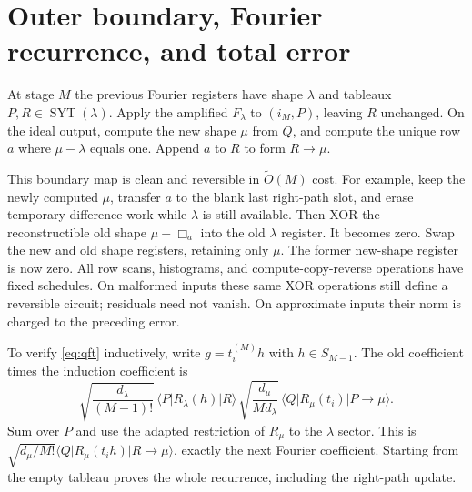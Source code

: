 \documentclass[11pt]{article}
\theoremstyle{definition}
\newcommand{\ket}[1]{\lvert #1\rangle}
\newcommand{\bra}[1]{\langle #1\rvert}
\newcommand{\SYT}{\operatorname{SYT}}
\begin{document}
\section{Outer boundary, Fourier recurrence, and total error}

At stage $M$ the previous Fourier registers have shape $\lambda$ and
tableaux $P,R\in\SYT(\lambda)$. Apply the amplified $F_\lambda$ to
$(i_M,P)$, leaving $R$ unchanged. On the ideal output, compute the new
shape $\mu$ from $Q$, and compute the unique row $a$ where $\mu-\lambda$
equals one. Append $a$ to $R$ to form $R\to\mu$.

This boundary map is clean and reversible in $\widetilde O(M)$ cost.
For example, keep the newly computed $\mu$, transfer $a$ to the blank
last right-path slot, and erase temporary difference work while $\lambda$
is still available. Then XOR the reconstructible old shape
$\mu-\Box_a$ into the old $\lambda$ register. It becomes zero. Swap the
new and old shape registers, retaining only $\mu$. The former new-shape
register is now zero. All row scans, histograms, and compute-copy-reverse
operations have fixed schedules. On malformed inputs these same XOR
operations still define a reversible circuit; residuals need not vanish.
On approximate inputs their norm is charged to the preceding error.

To verify \eqref{eq:qft} inductively, write $g=t_i^{(M)}h$ with
$h\in S_{M-1}$. The old coefficient times the induction coefficient is
\[
 \sqrt{\frac{d_\lambda}{(M-1)!}}\,
 \bra P R_\lambda(h)\ket R\,
 \sqrt{\frac{d_\mu}{M d_\lambda}}\,
 \bra Q R_\mu(t_i)\ket{P\to\mu}.
\]
Sum over $P$ and use the adapted restriction of $R_\mu$ to the
$\lambda$ sector. This is
$\sqrt{d_\mu/M!}\bra Q R_\mu(t_i h)\ket{R\to\mu}$,
exactly the next Fourier coefficient. Starting from the empty tableau
proves the whole recurrence, including the right-path update.
\end{document}
